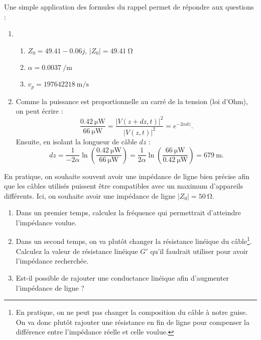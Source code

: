 \documentclass [a4paper, 11pt] {article}
\begin{document}
    \begin{reponse}
        Une simple application des formules du rappel permet de répondre aux questions :
        
        \begin{enumerate}
            \item \begin{enumerate}
                \item $Z_0=49.41-0.06j$, $|Z_0|=\SI{49.41}{\ohm}$
                \item $\alpha=\SI{0.0037}{\per\meter}$
                \item $v_p=\SI{197642218}{\meter\per\second}$
            \end{enumerate}
            \item Comme la puissance est proportionnelle au carré de la tension (loi d'Ohm), on peut écrire :
            \begin{equation}
                \frac{\SI{0.42}{\micro\watt}}{\SI{66}{\micro\watt}} = \frac{|V(z+dz,t)|^2}{|V(z,t)|^2} = e^{-2\alpha dz}.
            \end{equation}
            Ensuite, en isolant la longueur de câble $dz$ :
            \begin{equation}
                dz = \frac{1}{-2\alpha}\ln\left(\frac{\SI{0.42}{\micro\watt}}{\SI{66}{\micro\watt}}\right) = \frac{1}{2\alpha}\ln\left(\frac{\SI{66}{\micro\watt}}{\SI{0.42}{\micro\watt}}\right) = \SI{679}{\meter}.
            \end{equation}
        \end{enumerate}
    \end{reponse}
    
    \begin{exercice}{2}
        En pratique, on souhaite souvent avoir une impédance de ligne bien précise afin que les câbles utilisés puissent être compatibles avec un maximum d'appareils différents. Ici, on souhaite avoir une impédance de ligne $|Z_0|=\SI{50}{\ohm}$.
        
        \begin{enumerate}
            \item Dans un premier temps, calculez la fréquence qui permettrait d'atteindre l'impédance voulue.
            \item Dans un second temps, on va plutôt changer la résistance linéique du câble\footnote{En pratique, on ne peut pas changer la composition du câble à notre guise. On va donc plutôt rajouter une résistance en fin de ligne pour compenser la différence entre l'impédance réelle et celle voulue.}. Calculez la valeur de résistance linéique $G'$ qu'il faudrait utiliser pour avoir l'impédance recherchée.
            \item Est-il possible de rajouter une conductance linéique afin d'augmenter l'impédance de ligne ?
        \end{enumerate}
    \end{exercice}
    
\end{document}
